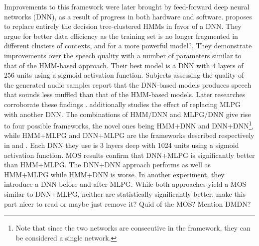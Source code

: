 \documentclass[a4paper, oneside, 12pt, english]{article}
\begin{document}
Improvements to this framework were later brought by feed-forward deep neural networks (DNN), as a result of progress in both hardware and software. \citep{SPSSDNN} proposes to replace entirely the decision tree-clustered HMMs in favor of a DNN. They argue for better data efficiency as the training set is no longer fragmented in different clusters of contexts\color{red}, and for a more powerful model?\color{black}. They demonstrate improvements over the speech quality with a number of parameters similar to that of the HMM-based approach. Their best model is a DNN with 4 layers of 256 units using a sigmoid activation function. Subjects assessing the quality of the generated audio samples report that the DNN-based models produces speech that sounds less muffled than that of the HMM-based models. Later researches corroborate these findings \citep{OnTheTrainingAspects}. \citep{Hashimoto-2015} additionally studies the effect of replacing MLPG with another DNN. The combinations of HMM/DNN and MLPG/DNN give rise to four possible frameworks, the novel ones being HMM+DNN and DNN+DNN\footnote{Note that since the two networks are consecutive in the framework, they can be considered a single network.}, while HMM+MLPG and DNN+MLPG are the frameworks described respectively in \citep{Tokuda-2013} and \citep{SPSSDNN}. Each DNN they use is 3 layers deep with 1024 units using a sigmoid activation function. MOS results confirm that DNN+MLPG is significantly better than HMM+MLPG. The DNN+DNN approach performs as well as HMM+MLPG while HMM+DNN is worse. In another experiment, they introduce a DNN before and after MLPG. While both approaches yield a MOS similar to DNN+MLPG, neither are statistically significantly better. \color{red} make this part nicer to read or maybe just remove it? Quid of the MOS? Mention DMDN?\color{black}

\end{document}
